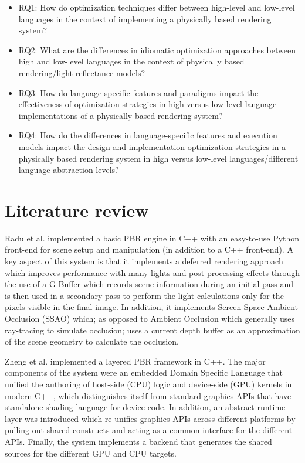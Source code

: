 \documentclass[11pt,a4paper,oneside]{article}
\begin{document}
\begin{itemize}[leftmargin=*, noitemsep]
    \item RQ1: How do optimization techniques differ between high-level and low-level languages in the context of implementing a physically based rendering system?
    \item RQ2: What are the differences in idiomatic optimization approaches between high and low-level languages in the context of physically based rendering/light reflectance models?
    \item RQ3: How do language-specific features and paradigms impact the effectiveness of optimization strategies in high versus low-level language implementations of a physically based rendering system? 
    \item RQ4: How do the differences in language-specific features and execution models impact the design and implementation optimization strategies in a physically based rendering system in high versus low-level languages/different language abstraction levels?
\end{itemize}

\section{Literature review}

Radu et al. \cite{rosu2020easypbr} implemented a basic PBR engine in C++ with an easy-to-use Python front-end for scene setup and manipulation (in addition to a C++ front-end). A key aspect of this system is that it implements a deferred rendering approach which improves performance with many lights and post-processing effects through the use of a G-Buffer which records scene information during an initial pass and is then used in a secondary pass to perform the light calculations only for the pixels visible in the final image. In addition, it implements Screen Space Ambient Occlusion (SSAO) which; as opposed to Ambient Occlusion which generally uses ray-tracing to simulate occlusion; uses a current depth buffer as an approximation of the scene geometry to calculate the occlusion.

\smallskip
Zheng et al. \cite{10.1145/3550454.3555463} implemented a layered PBR framework in C++. The major components of the system were an embedded Domain Specific Language that unified the authoring of host-side (CPU) logic and device-side (GPU) kernels in modern C++, which distinguishes itself from standard graphics APIs that have standalone shading language for device code. In addition, an abstract runtime layer was introduced which re-unifies graphics APIs across different platforms by pulling out shared constructs and acting as a common interface for the different APIs. Finally, the system implements a backend that generates the shared sources for the different GPU and CPU targets. 
\end{document}
